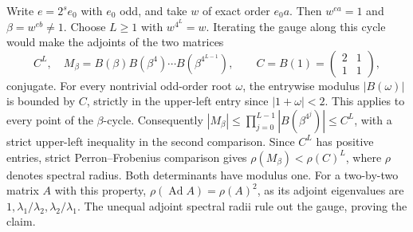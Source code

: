 \documentclass[11pt,a4paper]{article}
\theoremstyle{definition}
\theoremstyle{remark}
\numberwithin{equation}{section}
\begin{document}
Write \(e=2^s e_0\) with \(e_0\) odd, and take \(w\) of exact order \(e_0a\). Then \(w^{ea}=1\) and \(\beta=w^{eb}\ne1\). Choose \(L\geq1\) with \(w^{4^L}=w\). Iterating the gauge along this cycle would make the adjoints of the two matrices
\[
 C^L,\quad M_\beta=B(\beta)B(\beta^4)\cdots B(\beta^{4^{L-1}}),
 \qquad C=B(1)=\begin{pmatrix}2&1\\1&1\end{pmatrix},
\]
conjugate. For every nontrivial odd-order root \(\omega\), the entrywise modulus \(|B(\omega)|\) is bounded by \(C\), strictly in the upper-left entry since \(|1+\omega|<2\). This applies to every point of the \(\beta\)-cycle. Consequently
\( |M_\beta|\leq\prod_{j=0}^{L-1}|B(\beta^{4^j})|\leq C^L\),
with a strict upper-left inequality in the second comparison. Since \(C^L\) has positive entries, strict Perron--Frobenius comparison gives
\(\rho(M_\beta)<\rho(C)^L\), where \(\rho\) denotes spectral radius. Both determinants have modulus one. For a two-by-two matrix \(A\) with this property, \(\rho(\operatorname{Ad}A)=\rho(A)^2\), as its adjoint eigenvalues are \(1,\lambda_1/\lambda_2,\lambda_2/\lambda_1\). The unequal adjoint spectral radii rule out the gauge, proving the claim.
\end{document}
